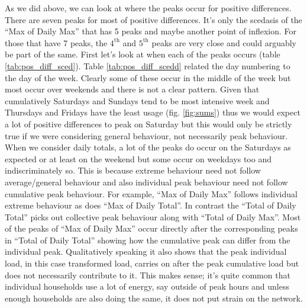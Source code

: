 As we did above, we can look at where the peaks occur for positive differences. There are seven peaks for most of positive differences. It's only the scedasis of the ``Max of Daily Max'' that has 5 peaks and maybe another point of inflexion. For those that have 7 peaks, the $4^{\text{th}}$ and $5^{\text{th}}$ peaks are very close and could arguably be part of the same. First let's look at when each of the peaks occurs (table \ref{tab:pos_diff_sced}). Table \ref{tab:pos_diff_scedd} related the day numbering to the day of the week. Clearly some of these occur in the middle of the week but most occur over weekends and there is not a clear pattern. Given that cumulatively Saturdays and Sundays tend to be most intensive week and Thursdays and Fridays have the least usage (fig. \ref{fig:sums}) thus we would expect a lot of positive differences to peak on Saturday but this would only be strictly true if we were considering general behaviour, not necessarily peak behaviour. When we consider daily totals, a lot of the peaks do occur on the Saturdays as expected or at least on the weekend but some occur on weekdays too and indiscriminately so. This is because extreme behaviour need not follow average/general behaviour and also individual peak behaviour need not follow cumulative peak behaviour.  For example, ``Max of Daily Max'' follows individual extreme behaviour as does ``Max of Daily Total''. In contrast the ``Total of Daily Total'' picks out collective peak behaviour along with ``Total of Daily Max''. Most of the peaks of ``Max of Daily Max'' occur directly after the corresponding peaks in ``Total of Daily Total'' showing how the cumulative peak can differ from the individual peak. Qualitatively speaking it also shows that the peak individual load, in this case transformed load, carries on after the peak cumulative load but does not necessarily contribute to it. This makes sense; it's quite common that individual households use a lot of energy, say outside of peak hours and unless enough households are also doing the same, it does not put strain on the network.


